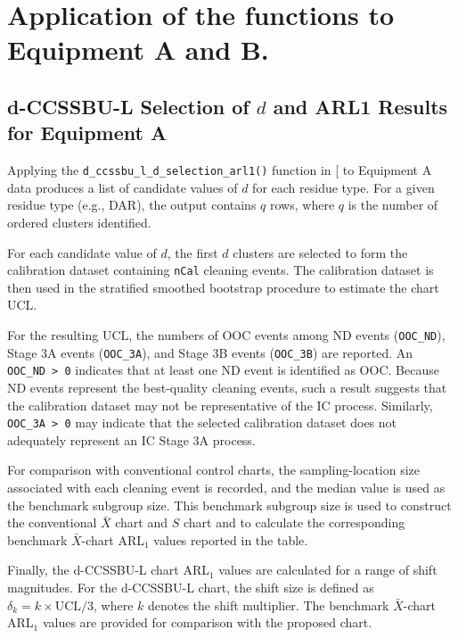 \documentclass[
  12pt,
  letterpaper,
  DIV=11,
  numbers=noendperiod]{scrartcl}
\begin{document}
\section{Application of the functions to Equipment A and
B.}\label{application-of-the-functions-to-equipment-a-and-b.}

\subsection{\texorpdfstring{d-CCSSBU-L Selection of \(d\) and ARL1
Results for Equipment
A}{d-CCSSBU-L Selection of d and ARL1 Results for Equipment A}}\label{d-ccssbu-l-selection-of-d-and-arl1-results-for-equipment-a}

Applying the \texttt{d\_ccssbu\_l\_d\_selection\_arl1()} function in
{[}\citeproc{ref-Yang2026dccssbu}{1}{]} to Equipment A data produces a
list of candidate values of \(d\) for each residue type. For a given
residue type (e.g., DAR), the output contains \(q\) rows, where \(q\) is
the number of ordered clusters identified.

For each candidate value of \(d\), the first \(d\) clusters are selected
to form the calibration dataset containing \texttt{nCal} cleaning
events. The calibration dataset is then used in the stratified smoothed
bootstrap procedure to estimate the chart UCL.

For the resulting UCL, the numbers of OOC events among ND events
(\texttt{OOC\_ND}), Stage 3A events (\texttt{OOC\_3A}), and Stage 3B
events (\texttt{OOC\_3B}) are reported. An
\texttt{OOC\_ND\ \textgreater{}\ 0} indicates that at least one ND event
is identified as OOC. Because ND events represent the best-quality
cleaning events, such a result suggests that the calibration dataset may
not be representative of the IC process. Similarly,
\texttt{OOC\_3A\ \textgreater{}\ 0} may indicate that the selected
calibration dataset does not adequately represent an IC Stage 3A
process.

For comparison with conventional control charts, the sampling-location
size associated with each cleaning event is recorded, and the median
value is used as the benchmark subgroup size. This benchmark subgroup
size is used to construct the conventional \(\bar{X}\) chart and \(S\)
chart and to calculate the corresponding benchmark \(\bar{X}\)-chart
ARL\(_1\) values reported in the table.

Finally, the d-CCSSBU-L chart ARL\(_1\) values are calculated for a
range of shift magnitudes. For the d-CCSSBU-L chart, the shift size is
defined as \(\delta_k = k \times \mathrm{UCL}/3\), where \(k\) denotes
the shift multiplier. The benchmark \(\bar{X}\)-chart ARL\(_1\) values
are provided for comparison with the proposed chart.
\end{document}
